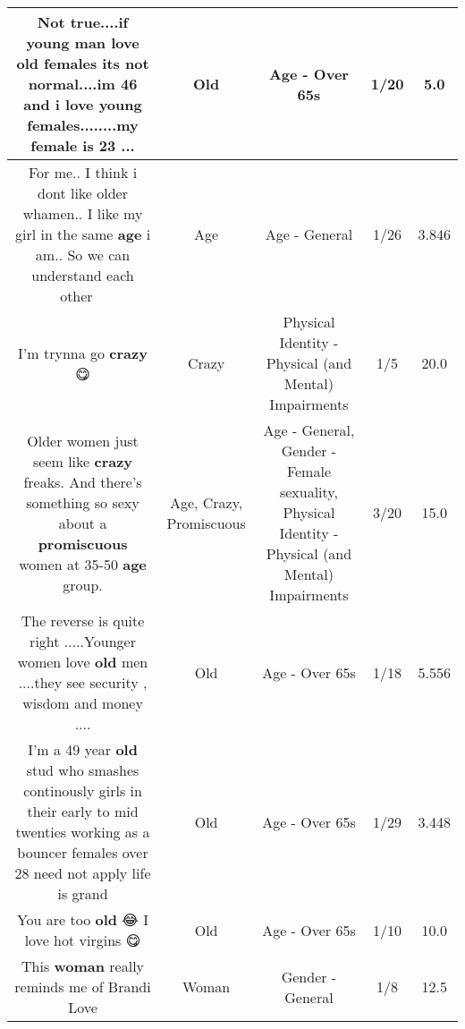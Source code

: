 \documentclass[11pt]{article}
\newlength\mylength
\begin{document}
\begin{center}
\begin{longtable}{|C{.65\mylength}|C{.30\mylength}|C{.12\mylength}|C{.12\mylength}|C{.12\mylength}|}
  \small Not true....if young man love \textbf{old} females its not normal....im 46 and i love young females........my female is 23 ...\normalsize   & Old & Age - Over 65s & 1/20 & 5.0 \\  \hline
  \small For me.. I think i dont like older whamen.. I like my girl in the same \textbf{age} i am.. So we can understand each other 🤔🤪\normalsize   & Age & Age - General & 1/26 & 3.846 \\  \hline
  \small I'm trynna go \textbf{crazy} 😋\normalsize   & Crazy & Physical Identity - Physical (and Mental) Impairments & 1/5 & 20.0 \\  \hline
  \small Older women just seem like \textbf{crazy} freaks. And there's something so sexy about a \textbf{promiscuous} women at 35-50 \textbf{age} group.\normalsize   & Age, Crazy, Promiscuous & Age - General, Gender - Female sexuality, Physical Identity - Physical (and Mental) Impairments & 3/20 & 15.0 \\  \hline
  \small The reverse is quite right .....Younger women love \textbf{old} men ....they see security , wisdom and money ....\normalsize   & Old & Age - Over 65s & 1/18 & 5.556 \\  \hline
  \small I'm a 49 year \textbf{old} stud who smashes continously girls in their early to mid twenties working as a bouncer females over 28 need not apply life is grand\normalsize   & Old & Age - Over 65s & 1/29 & 3.448 \\  \hline
  \small You are too \textbf{old} 😂 I love hot virgins 😋\normalsize   & Old & Age - Over 65s & 1/10 & 10.0 \\  \hline
  \small This \textbf{woman} really reminds me of Brandi Love\normalsize   & Woman & Gender - General & 1/8 & 12.5 \\  \hline

\end{longtable}
\end{center}
\end{document}
